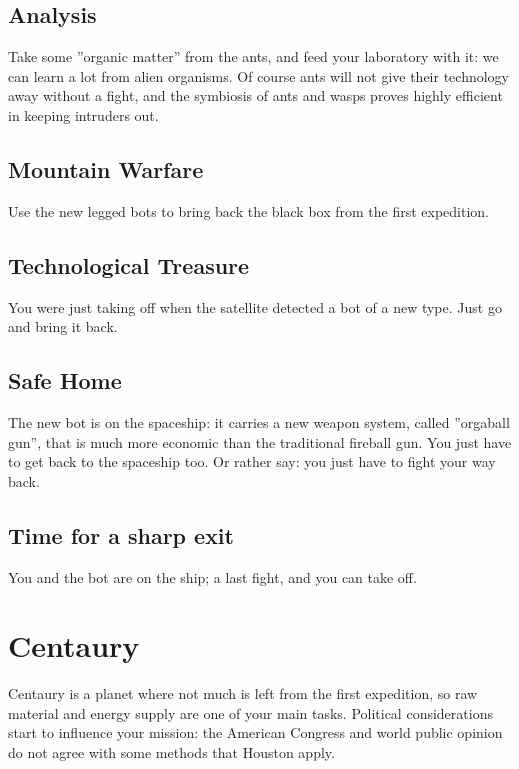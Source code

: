 \subsection{Analysis}

Take some ''organic matter'' from the ants, and feed your laboratory with it: we can learn a lot from alien
organisms. Of course ants will not give their technology away without a fight, and the symbiosis of ants and
wasps proves highly efficient in keeping intruders out.


\subsection{Mountain Warfare}

Use the new legged bots to bring back the black box from the first expedition.


\subsection{Technological Treasure}

You were just taking off when the satellite detected a bot of a new type. Just go and bring it back.


\subsection{Safe Home}

The new bot is on the spaceship: it carries a new weapon system, called ''orgaball gun'', that is much more economic than the traditional fireball gun. You just have to get back to the spaceship too. Or rather say: you just have to fight your way back.


\subsection{Time for a sharp exit}

You and the bot are on the ship; a last fight, and you can take off.


\newpage
\section{Centaury}

Centaury is a planet where not much is left from the first expedition, so raw material and energy supply are one of your main tasks. Political considerations start to influence your mission: the American Congress and world public opinion do not agree with some methods that Houston apply.


